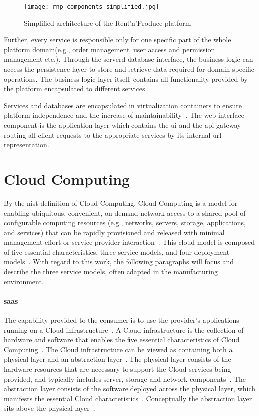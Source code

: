 \documentclass[
a4paper,
twoside,
headsepline,
cleardoublepage=empty,
parskip=half,
draft=false
]{scrbook}
\begin{document}
			\begin{figure}[H]
				\centering
				\texttt{[image: rnp\_components\_simplified.jpg]}
				\caption{Simplified architecture of the Rent'n'Produce platform}
				\label{fig:rnp_architecture}
			\end{figure}

			Further, every service is responsible only for one specific part of the whole platform domain(e.g., order management, user access and permission management etc.).
			Through the serverd database interface, the business logic can access the persistence layer to store and retrieve data required for domain specific operations.
			The business logic layer itself, contains all functionality provided by the platform encapsulated to different services.

			Services and databases are encapsulated in virtualization containers to ensure platform independence and the increase of maintainability~\cite{xen.17b}.
			The web interface component is the application layer which contains the \gls{ui} and the \gls{api} gateway routing all client requests to the appropriate services by its internal \gls{url} representation.

		\section{Cloud Computing}\label{sec:cloud_computing}

			By the \gls{nist} definition of Cloud Computing, Cloud Computing is a model for enabling ubiquitous, convenient, on-demand network access to a shared pool of configurable computing resources (e.g., networks, servers, storage, applications, and services) that can be rapidly provisioned and released with minimal management effort or service provider interaction~\cite{mell2011nist}.
			This cloud model is composed of five essential characteristics, three service models, and four deployment
			models~\cite{fehling2014cloud}. 
			With regard to this work, the following paragraphs will focus and describe the three service models, often adapted in the manufacturing environment.

			\paragraph{\gls{saas}} The capability provided to the consumer is to use the provider's applications running on a Cloud infrastructure~\cite{mell2011nist}.
			A Cloud infrastructure is the collection of hardware and software that enables the five essential characteristics of Cloud Computing~\cite{mell2011nist}. 
			The Cloud infrastructure can be viewed as containing both a physical layer and an abstraction layer~\cite{fehling2014cloud}. 
			The physical layer consists of the hardware resources that are necessary to support the Cloud services being provided, and typically includes server, storage and network components~\cite{fehling2014cloud}.
			The abstraction layer consists of the software deployed across the physical layer, which manifests the essential Cloud characteristics~\cite{fehling2014cloud}. 
			Conceptually the abstraction layer sits above the physical layer~\cite{fehling2014cloud}.
			
\end{document}

